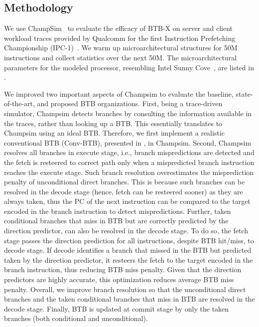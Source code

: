 
\subsection{Methodology}
We use ChampSim~\cite{champsim} to evaluate the efficacy of BTB-X on server and client workload traces provided by Qualcomm for the first Instruction Prefetching Championship (IPC-1)~\cite{ipc1}. We warm up microarchitectural structures for 50M instructions and collect statistics over the next 50M. The microarchitectural parameters for the modeled processor, resembling Intel Sunny Cove~\cite{sunnycove}, are listed in .

We improved two important aspects of Champsim to evaluate the baseline, state-of-the-art, and proposed BTB organizations. First, being a trace-driven simulator, Champsim detects branches by consulting the information available in the traces, rather than looking up a BTB. This essentially translates to Champsim using an ideal BTB. Therefore, we first implement a realistic conventional BTB (Conv-BTB), presented in , in Champsim. Second, Champsim resolves all branches in execute stage, i.e., branch mispredictions are detected and the fetch is resteered to correct path only when a mispredicted branch instruction reaches the execute stage. Such branch resolution overestimates the misprediction penalty of unconditional direct branches. This is because such branches can be resolved in the decode stage (hence, fetch can be resteered sooner) as they are always taken, thus the PC of the next instruction can be compared to the target encoded in the branch instruction to detect mispredictions. Further, taken conditional branches that miss in BTB but are correctly predicted by the direction predictor, can also be resolved in the decode stage. To do so, the fetch stage passes the direction prediction for all instructions, despite BTB hit/miss, to decode stage. If decode identifies a branch that missed in the BTB but predicted taken by the direction predictor, it resteers the fetch to the target encoded in the branch instruction, thus reducing BTB miss penalty. Given that the direction predictors are highly accurate, this optimization reduces average BTB miss penalty. Overall, we improve branch resolution so that the unconditional direct branches and the taken conditional branches that miss in BTB are resolved in the decode stage. Finally, BTB is updated at commit stage by only the taken branches (both conditional and unconditional).

